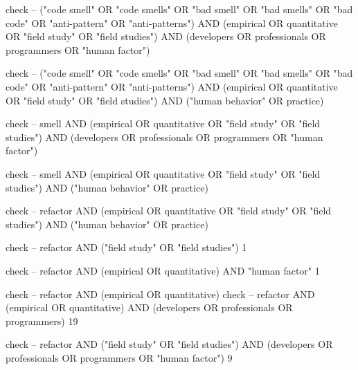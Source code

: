 check -- ("code smell" OR "code smells" OR "bad smell" OR "bad smells" OR "bad code" OR "anti-pattern" OR "anti-patterns") AND (empirical OR quantitative OR "field study" OR "field studies") AND (developers OR professionals OR programmers OR "human factor")

check -- ("code smell" OR "code smells" OR "bad smell" OR "bad smells" OR "bad code" OR "anti-pattern" OR "anti-patterns") AND (empirical OR quantitative OR "field study" OR "field studies") AND ("human behavior" OR practice)

check -- smell AND (empirical OR quantitative OR "field study" OR "field studies") AND (developers OR professionals OR programmers OR "human factor")

check -- smell AND (empirical OR quantitative OR "field study" OR "field studies") AND ("human behavior" OR practice)



check -- refactor AND (empirical OR quantitative OR "field study" OR "field studies") AND ("human behavior" OR practice)






check -- refactor AND ("field study" OR "field studies")
1

check -- refactor AND (empirical OR quantitative) AND "human factor"
1

check -- refactor AND (empirical OR quantitative) 
check -- refactor AND (empirical OR quantitative) AND (developers OR professionals OR programmers)
19

check -- refactor AND ("field study" OR "field studies") AND (developers OR professionals OR programmers OR "human factor")
9

